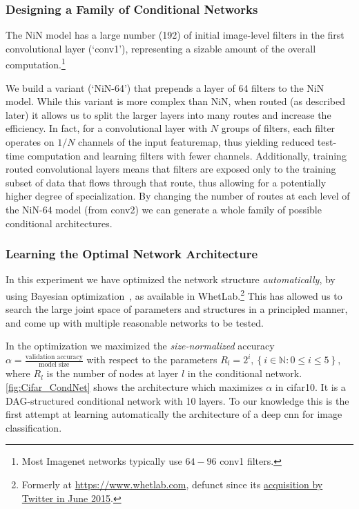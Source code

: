\documentclass[thesis]{subfiles}
\begin{document}
	\subsubsection{Designing a Family of Conditional Networks}
	The NiN model has a large number (192) of initial image-level filters in the first convolutional layer (`conv1'), 
	representing a sizable amount of the overall computation.\footnote{Most Imagenet networks typically use $64-96$ conv1 filters.}
	
	We build a variant (`NiN-64') that prepends a layer of 64 filters to the NiN model.
	While this variant is more complex than NiN, when routed (as described later) it allows us 
	to split the larger layers into many routes and increase the efficiency.
	In fact, for a convolutional layer with $N$ groups of filters, each filter operates on $1/N$ channels of the input \gls{featuremap}, thus yielding reduced test-time computation and learning filters with fewer channels. 
	Additionally, training routed convolutional layers means that filters are exposed only to the training subset of data that flows through that route, thus allowing for a potentially higher degree of specialization.
	By changing the number of routes at each level of the NiN-64 model (from conv2) we can 
	generate a whole family of possible conditional architectures. 
	
	\subsubsection{Learning the Optimal Network Architecture}
	In this experiment we have optimized the network structure {\em automatically}, 
	by using Bayesian optimization~\citep{Snoek2012}, as available in WhetLab.\footnote{Formerly at \href{https://www.whetlab.com}{https://www.whetlab.com}, defunct since its \href{https://techcrunch.com/2015/06/17/twitter-acquires-machine-learning-startup-whetlab/}{acquisition by Twitter in June 2015}.} 
	This has allowed us to search the large joint space of parameters and structures in a principled manner, 
	and come up with multiple reasonable networks to be tested. 
	
	In the optimization we maximized the {\em size-normalized} accuracy $\alpha =\frac{\textrm{validation accuracy}}{\textrm{model size}}$ with respect to the parameters $R_l = 2^i, \left\{i\in \mathbb{N} : 0 \le i \le 5\right\}$, where $R_l$ is the number of nodes at layer $l$ in the conditional network. 
	\cref{fig:Cifar_CondNet} shows the architecture which maximizes $\alpha$ in \gls{cifar10}. 
	It is a DAG-structured conditional network with 10 layers.
	To our knowledge this is the first attempt at learning automatically the architecture of a deep \gls{cnn} for image classification.
	
\end{document}
